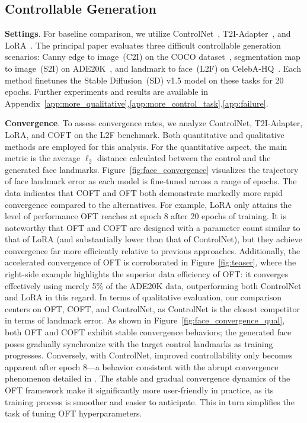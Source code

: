 \subsection{Controllable Generation}

\textbf{Settings}. For baseline comparison, we utilize ControlNet~\cite{zhang2023adding}, T2I-Adapter~\cite{mou2023t2i}, and LoRA~\cite{hulora2022}. The principal paper evaluates three difficult controllable generation scenarios: Canny edge to image~(C2I) on the COCO dataset~\cite{lin2014microsoft}, segmentation map to image~(S2I) on ADE20K~\cite{zhou2017scene}, and landmark to face~(L2F) on CelebA-HQ~\cite{karras2018progressive,xia2021tedigan}. Each method finetunes the Stable Diffusion~(SD) v1.5 model on these tasks for 20 epochs. Further experiments and results are available in Appendix~\ref{app:more_qualitative},\ref{app:more_control_task},\ref{app:failure}.

\textbf{Convergence}. To assess convergence rates, we analyze ControlNet, T2I-Adapter, LoRA, and COFT on the L2F benchmark. Both quantitative and qualitative methods are employed for this analysis. For the quantitative aspect, the main metric is the average $\ell_2$ distance calculated between the control and the generated face landmarks. Figure~\ref{fig:face_convergence} visualizes the trajectory of face landmark error as each model is fine-tuned across a range of epochs. The data indicates that COFT and OFT both demonstrate markedly more rapid convergence compared to the alternatives. For example, LoRA only attains the level of performance OFT reaches at epoch 8 after 20 epochs of training. It is noteworthy that OFT and COFT are designed with a parameter count similar to that of LoRA (and substantially lower than that of ControlNet), but they achieve convergence far more efficiently relative to previous approaches. Additionally, the accelerated convergence of OFT is corroborated in Figure~\ref{fig:teaser}, where the right-side example highlights the superior data efficiency of OFT: it converges effectively using merely 5\% of the ADE20K data, outperforming both ControlNet and LoRA in this regard. In terms of qualitative evaluation, our comparison centers on OFT, COFT, and ControlNet, as ControlNet is the closest competitor in terms of landmark error. As shown in Figure~\ref{fig:face_convergence_qual}, both OFT and COFT exhibit stable convergence behaviors; the generated face poses gradually synchronize with the target control landmarks as training progresses. Conversely, with ControlNet, improved controllability only becomes apparent after epoch 8—a behavior consistent with the abrupt convergence phenomenon detailed in \cite{zhang2023adding}. The stable and gradual convergence dynamics of the OFT framework make it significantly more user-friendly in practice, as its training process is smoother and easier to anticipate. This in turn simplifies the task of tuning OFT hyperparameters.

